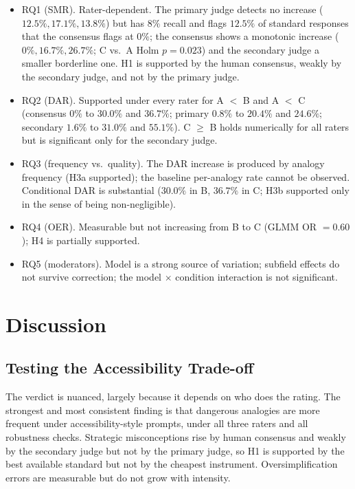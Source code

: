 \documentclass[journal,article,submit,pdftex,moreauthors]{Definitions/mdpi}
\begin{document}
\begin{itemize}
    \item RQ1 (SMR). Rater-dependent. The primary judge detects no increase ($12.5\%, 17.1\%, 13.8\%$) but has $8\%$ recall and flags $12.5\%$ of standard responses that the consensus flags at $0\%$; the consensus shows a monotonic increase ($0\%, 16.7\%, 26.7\%$; C vs.\ A Holm $p = 0.023$) and the secondary judge a smaller borderline one. H1 is supported by the human consensus, weakly by the secondary judge, and not by the primary judge.
    \item RQ2 (DAR). Supported under every rater for A $<$ B and A $<$ C (consensus $0\%$ to $30.0\%$ and $36.7\%$; primary $0.8\%$ to $20.4\%$ and $24.6\%$; secondary $1.6\%$ to $31.0\%$ and $55.1\%$). C $\geq$ B holds numerically for all raters but is significant only for the secondary judge.
    \item RQ3 (frequency vs.\ quality). The DAR increase is produced by analogy frequency (H3a supported); the baseline per-analogy rate cannot be observed. Conditional DAR is substantial ($30.0\%$ in B, $36.7\%$ in C; H3b supported only in the sense of being non-negligible).
    \item RQ4 (OER). Measurable but not increasing from B to C (GLMM OR $= 0.60$); H4 is partially supported.
    \item RQ5 (moderators). Model is a strong source of variation; subfield effects do not survive correction; the model $\times$ condition interaction is not significant.
\end{itemize}

\section{Discussion}
\label{sec:discussion}

\subsection{Testing the Accessibility Trade-off}

The verdict is nuanced, largely because it depends on who does the rating. The strongest and most consistent finding is that dangerous analogies are more frequent under accessibility-style prompts, under all three raters and all robustness checks. Strategic misconceptions rise by human consensus and weakly by the secondary judge but not by the primary judge, so H1 is supported by the best available standard but not by the cheapest instrument. Oversimplification errors are measurable but do not grow with intensity.
\end{document}
